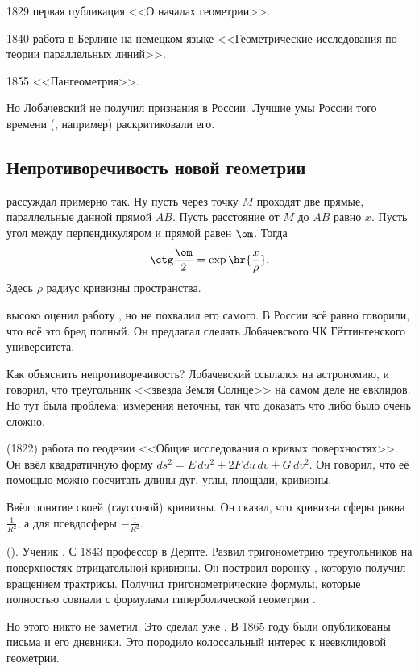 \documentclass[a4paper,oneside,fleqn,10pt]{article}
\begin{document}
1829 первая публикация <<О началах геометрии>>.

1840 работа в Берлине на немецком языке <<Геометрические исследования
по теории параллельных линий>>.

1855 <<Пангеометрия>>.

Но Лобачевский не получил признания в России.
Лучшие умы России того времени (, например)
раскритиковали его.

\subsection{Непротиворечивость новой геометрии}

 рассуждал примерно так.
Ну пусть через точку $M$ проходят две прямые, параллельные данной
прямой $AB$. Пусть расстояние от $M$ до $AB$ равно $x$.
Пусть угол между перпендикуляром и прямой равен $\om$.
Тогда
$$\ctg \frac{\om}{2} = \exp\hr{\frac{x}{\rho}}.$$
Здесь $\rho$ радиус кривизны пространства.

 высоко оценил работу , но не похвалил его самого.
В России всё равно говорили, что всё это бред полный.
Он предлагал сделать Лобачевского ЧК Гёттингенского университета.

Как объяснить непротиворечивость? Лобачевский ссылался на астрономию,
и говорил, что треугольник <<звезда Земля Солнце>> на самом деле
не евклидов. Но тут была проблема: измерения неточны, так что доказать
что либо было очень сложно.

 (1822) работа по геодезии <<Общие исследования о кривых поверхностях>>.
Он ввёл квадратичную форму $ds^2 = E\,du^2 + 2F\,du\,dv + G\, dv^2$.
Он говорил, что её помощью можно посчитать длины дуг, углы, площади, кривизны.

Ввёл понятие своей (гауссовой) кривизны. Он сказал, что кривизна сферы равна $\frac{1}{R^2}$,
а для псевдосферы $-\frac{1}{R^2}$.

 (). Ученик .
С 1843 профессор в Дерпте. Развил тригонометрию треугольников
на поверхностях отрицательной кривизны. Он построил
воронку , которую получил вращением трактрисы.
Получил тригонометрические формулы, которые полностью совпали с формулами гиперболической
геометрии .

Но этого никто не заметил. Это сделал уже .
В 1865 году были опубликованы письма  и его дневники.
Это породило колоссальный интерес к неевклидовой геометрии.
\end{document}
